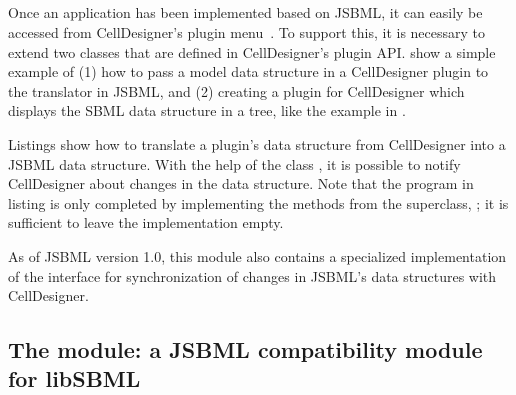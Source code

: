 \subsection{}

Once an application has been implemented based on JSBML, it can easily be
accessed from CellDesigner's plugin menu~\citep{Funahashi2003}. To support
this, it is necessary to extend two classes that are defined in
CellDesigner's plugin API. 
show a simple example of (1) how to pass a model
data structure in a CellDesigner plugin to the translator in JSBML, and (2)
creating a plugin for CellDesigner which displays the SBML data structure
in a tree, like the example in .


Listings  show how to translate a
plugin's data structure from CellDesigner into a JSBML data structure. With
the help of the class \PluginSBMLWriter, it is possible to notify
CellDesigner about changes in the data structure. Note that the program in
listing  is only completed by implementing the methods from the
superclass, ; it is sufficient to leave the
implementation empty.

As of JSBML version 1.0, this module also contains a specialized
implementation of the \TreeNodeChangeListener{} interface for
synchronization of changes in JSBML's data structures with CellDesigner.


\clearpage

\subsection{The  module: a JSBML compatibility
  module for libSBML}

